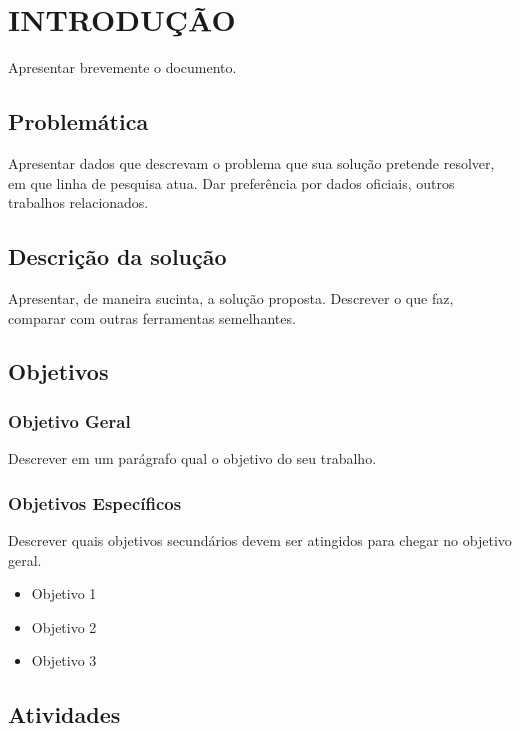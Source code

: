 %
%
\chapter{INTRODUÇÃO}\label{chap:introducao}

Apresentar brevemente o documento.

\section{Problemática}

Apresentar dados que descrevam o problema que sua solução pretende resolver, em que linha de pesquisa atua. Dar preferência por dados oficiais, outros trabalhos relacionados. 

\section{Descrição da solução}

Apresentar, de maneira sucinta, a solução proposta. Descrever o que faz, comparar com outras ferramentas semelhantes.

\section{Objetivos}

\subsection{Objetivo Geral}

Descrever em um parágrafo qual o objetivo do seu trabalho.


\subsection{Objetivos Específicos}

Descrever quais objetivos secundários devem ser atingidos para chegar no objetivo geral.

\begin{itemize}
    \item Objetivo 1
    \item Objetivo 2
    \item Objetivo 3
\end{itemize}

\section{Atividades}

